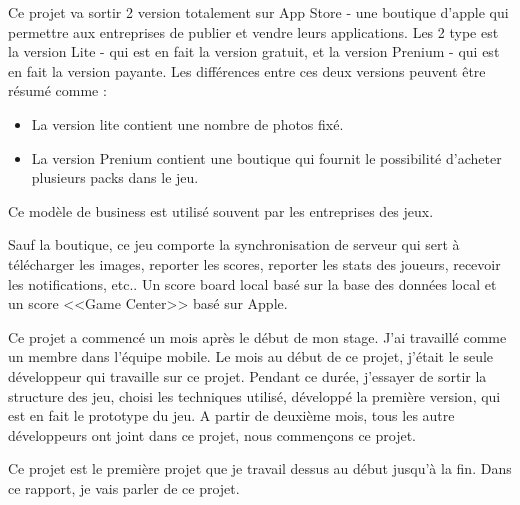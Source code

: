 Ce projet va sortir 2 version totalement sur App Store - une boutique d'apple qui permettre aux entreprises de publier et vendre leurs applications. Les 2 type est la version Lite - qui est en fait la version gratuit, et la version Prenium - qui est en fait la version payante. Les différences entre ces deux versions peuvent être résumé comme : 
\begin{itemize}
	\item La version lite contient une nombre de photos fixé. 
	\item La version Prenium contient une boutique qui fournit le possibilité d'acheter plusieurs packs dans le jeu. 
\end{itemize}
Ce modèle de business est utilisé souvent par les entreprises des jeux. 

Sauf la boutique, ce jeu comporte la synchronisation de serveur qui sert à télécharger les images, reporter les scores, reporter les stats des joueurs, recevoir les notifications, etc.. Un score board local basé sur la base des données local et un score <<Game Center>> basé sur Apple.

Ce projet a commencé un mois après le début de mon stage. J'ai travaillé comme un membre dans l'équipe mobile. Le mois au début de ce projet, j'était le seule développeur qui travaille sur ce projet. Pendant ce durée, j'essayer de sortir la structure des jeu, choisi les techniques utilisé, développé la première version, qui est en fait le prototype du jeu. A partir de deuxième mois, tous les autre développeurs ont joint dans ce projet, nous commençons ce projet.

Ce projet est le première projet que je travail dessus au début jusqu'à la fin. Dans ce rapport, je vais parler de ce projet.



